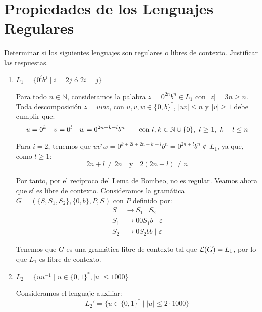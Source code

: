 \newpage
\section{Propiedades de los Lenguajes Regulares}

\begin{ejercicio}\label{ej:1.3.1}
    Determinar si los siguientes lenguajes son regulares o libres de contexto. Justificar las respuestas.
    \begin{enumerate}
        \item $L_1=\{0^i b^j \mid i = 2j \text{\ ó\ } 2i=j\}$
        
        Para todo $n\in \mathbb{N}$, consideramos la palabra $z=0^{2n}b^n\in L_1$ con $|z|=3n\geq n$. Toda descomposición $z=uvw$, con $u,v,w\in \{0,b\}^\ast$, $|uv|\leq n$ y $|v|\geq 1$ debe cumplir que:
        \begin{equation*}
            u=0^k \quad v=0^l \quad w=0^{2n-k-l}b^n \qquad \text{con } l,k\in \mathbb{N}\cup \{0\},~l\geq 1,~k+l\leq n
        \end{equation*}

        Para $i=2$, tenemos que $uv^iw=0^{k+2l+2n-k-l}b^n=0^{2n+l}b^n\notin L_1$, ya que, como $l\geq 1$:
        \begin{equation*}
            2n+l\neq 2n \quad \text{y} \quad 2(2n+l)\neq n
        \end{equation*}

        Por tanto, por el recíproco del Lema de Bombeo, no es regular. Veamos ahora que sí es libre de contexto. Consideramos la gramática $G=(\{S,S_1,S_2\},\{0,b\},P,S)$ con $P$ definido por:
        \begin{align*}
            S &\rightarrow S_1 \mid S_2 \\
            S_1 &\rightarrow 00S_1b \mid \varepsilon \\
            S_2 &\rightarrow 0S_2bb \mid \varepsilon
        \end{align*}

        Tenemos que $G$ es una gramática libre de contexto tal que $\mathcal{L}(G)=L_1$, por lo que $L_1$ es libre de contexto.

        \item $L_2=\{uu^{-1} \mid u \in {\{0,1\}}^\ast, |u|\leq 1000\}$
        
        Consideramos el lenguaje auxiliar:
        \begin{equation*}
            L_2' = \{u\in \{0,1\}^\ast \mid |u|\leq 2\cdot 1000\}
        \end{equation*}


\end{enumerate}
\end{ejercicio}
